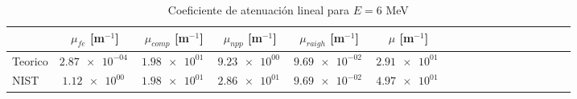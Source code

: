 \begin{table}
\caption{Coeficiente de atenuación lineal para $E=6$ MeV}
\begin{tabular}{lcccccccccccccccc}
\toprule
 & $\mu_{fe}$ [m$^{-1}$] & $\mu_{comp}$ [m$^{-1}$] & $\mu_{npp}$ [m$^{-1}$] & $\mu_{raigh}$ [m$^{-1}$] & $\mu$ [m$^{-1}$] \\
\midrule
Teorico & $\SI{2.87e-04}{}$ & $\SI{1.98e+01}{}$ & $\SI{9.23e+00}{}$ & $\SI{9.69e-02}{}$ & $\SI{2.91e+01}{}$ \\
NIST & $\SI{1.12e+00}{}$ & $\SI{1.98e+01}{}$ & $\SI{2.86e+01}{}$ & $\SI{9.69e-02}{}$ & $\SI{4.97e+01}{}$ \\
\bottomrule
\end{tabular}
\end{table}
